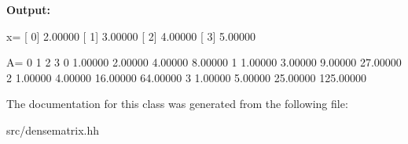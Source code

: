 {\bfseries Output:} \begin{DoxyVerb}
x=
[ 0]   2.00000
[ 1]   3.00000
[ 2]   4.00000
[ 3]   5.00000

A=
                      0          1          2          3 
          0     1.00000    2.00000    4.00000    8.00000 
          1     1.00000    3.00000    9.00000   27.00000 
          2     1.00000    4.00000   16.00000   64.00000 
          3     1.00000    5.00000   25.00000  125.00000 

	\end{DoxyVerb}
 

The documentation for this class was generated from the following file:\begin{DoxyCompactItemize}
\item 
src/densematrix.hh\end{DoxyCompactItemize}
